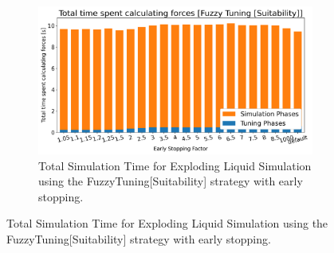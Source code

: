 \documentclass[conference]{IEEEtran}
\begin{document}
\begin{figure}[h]
\begin{subfigure}[b]{\columnwidth}
        \includegraphics[width=\columnwidth]{../data/explodingLiquid/cluster/fuzzyTuningEvidenceBased_2threads/analytics/total_time_average.png}

        \caption{Total Simulation Time for Exploding Liquid Simulation using the FuzzyTuning[Suitability] strategy with early stopping.}
        \label{fig:fuzzy_tuning}
    \end{subfigure}
\end{figure}
\end{document}
